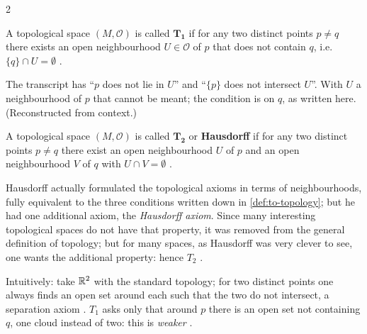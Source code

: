 \begin{paracol}{2}
\begin{definition}\label{def:iv-T1}
A topological space $(M,\mathcal O)$ is called $\mathbf{T_1}$ if for any two distinct points $p\ne q$ there exists an open neighbourhood
$U\in\mathcal O$ of $p$ that does not contain $q$, i.e.\ $\{q\}\cap U=\emptyset$ .
\end{definition}
\begin{coursenote}
The transcript has ``$p$ does not lie in $U$'' and ``$\{p\}$ does not intersect $U$''. With $U$ a neighbourhood of $p$ that cannot be
meant; the condition is on $q$, as written here. (Reconstructed from context.)
\end{coursenote}

\begin{definition}\label{def:iv-T2}
A topological space $(M,\mathcal O)$ is called $\mathbf{T_2}$ or \textbf{Hausdorff} if for any two distinct points $p\ne q$ there exist an open
neighbourhood $U$ of $p$ and an open neighbourhood $V$ of $q$ with $U\cap V=\emptyset$ .
\end{definition}
Hausdorff actually formulated the topological axioms in terms of neighbourhoods, fully equivalent to the three conditions written down in
\cref{def:to-topology}; but he had one additional axiom, the \emph{Hausdorff axiom}. Since many interesting topological spaces do not have that
property, it was removed from the general definition of topology; but for many spaces, as Hausdorff was very clever to see, one wants the
additional property: hence $T_2$ .

Intuitively: take $\mathbb{R}^2$ with the standard topology; for two distinct points one always finds an open set around each such that the two do not
intersect, a separation axiom . $T_1$ asks only that around $p$ there is an open set not containing $q$, one cloud instead of two: this is
\emph{weaker} .


\end{paracol}
